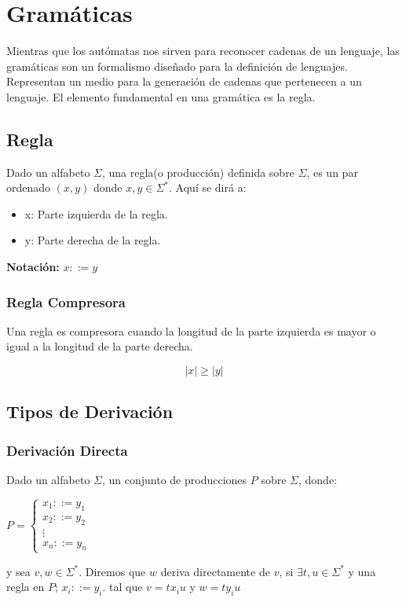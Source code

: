 \chapter{Gramáticas}

Mientras que los autómatas nos sirven para reconocer cadenas de un lenguaje, las gramáticas son un formalismo diseñado para la definición de lenguajes. Representan un medio para la generación de cadenas que pertenecen a un lenguaje. El elemento fundamental en una gramática es la regla.

\section{Regla}

Dado un alfabeto $\Sigma$, una regla(o producción) definida sobre $\Sigma$, es un par ordenado $(x,y)$ donde $x,y\in \Sigma^*$. Aquí se dirá a:
\begin{itemize}
\item x: Parte izquierda de la regla.
\item y: Parte derecha de la regla.
\end{itemize}

\textbf{Notación: }$x::=y$

\subsection{Regla Compresora}
Una regla es compresora cuando la longitud de la parte izquierda es mayor o igual a la longitud de la parte derecha.

$$
|x|\geq |y|
$$

\section{Tipos de Derivación}
\subsection{Derivación Directa}
Dado un alfabeto $\Sigma$, un conjunto de producciones $P$ sobre $\Sigma$, donde:

$P= \left \{ \begin{array}{c}
					x_1::=y_1\\
					x_2::=y_2\\
					\vdots \\
					x_n::=y_n \end{array} \right.$
					

y sea $v,w\in \Sigma^*$. Diremos que $w$ deriva directamente de $v$, si $\exists t,u \in \Sigma^*$ y una regla en $P$; $x_i::=y_i$. tal que $v=tx_iu$  y  $w=ty_iu$

